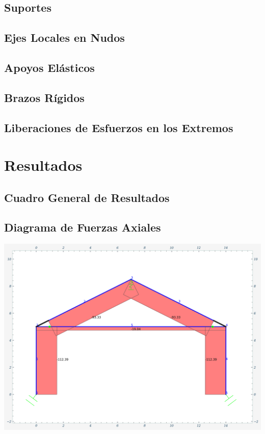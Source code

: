 \subsection{Suportes}
\subsection{Ejes Locales en Nudos}
\subsection{Apoyos Elásticos}
\subsection{Brazos Rígidos}
\subsection{Liberaciones de Esfuerzos en los Extremos}



\section{Resultados}
\subsection{Cuadro General de Resultados}
\subsection{Diagrama de Fuerzas Axiales}
\includegraphics[width=1\textwidth]{img/diag_axiales.png}

